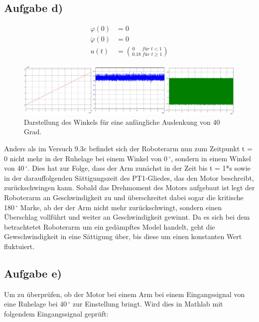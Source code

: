 \documentclass[10pt]{scrartcl}
\begin{document}
\subsection{Aufgabe d)}
\begin{align}
\varphi  (0) &= 0 \\
\dot \varphi (0) &= 0 \\
u(t)  &= \binom{0\,\,\,\,\,\,\,\,\, für\,\, t<1}{0.18\,\, für\,\, t \geq 1}
\end{align}
\begin{figure}[H]
	\centering
	\includegraphics[width=1.2\textwidth]{Theoretischer Teil/Aufgabe9c.png}
	\caption{Darstellung des Winkels für eine anfängliche Auslenkung von 40 Grad. }
	\label{img:grafik-dummy}
\end{figure}

Anders als im Versuch 9.3c befindet sich der Roboterarm nun zum Zeitpunkt
t = 0 nicht mehr in der Ruhelage bei einem Winkel von 0\,$^\circ$, sondern in einem 
Winkel von 40\,$^\circ$. Dies hat zur Folge, dass der Arm zunächst 
in der Zeit bis t = 1*s
sowie in der darauffolgenden Sättigungszeit des PT1-Gliedes,
das den Motor beschreibt, zurückschwingen kann.
Sobald das Drehmoment des Motors aufgebaut ist legt der Roboterarm 
an Geschwindigkeit zu und überschreitet dabei sogar die kritische 180\,$^\circ$
Marke, ab der der Arm nicht mehr zurückschwingt, sondern einen Überschlag
vollführt und weiter an Geschwindigkeit gewinnt.
Da es sich bei dem betrachtetet Roboterarm um ein gedämpftes Model
handelt, geht die Gewschwindigkeit in eine Sättigung über, bis diese um
einen konstanten Wert fluktuiert. 


\subsection{Aufgabe e)}
Um zu überprüfen, ob der Motor bei einem Arm bei einem Eingangssignal von eine Ruhelage bei 40\,$^\circ$ zur Einstellung bringt. Wird dies in Mathlab mit folgendem Eingangssignal geprüft:
\end{document}
